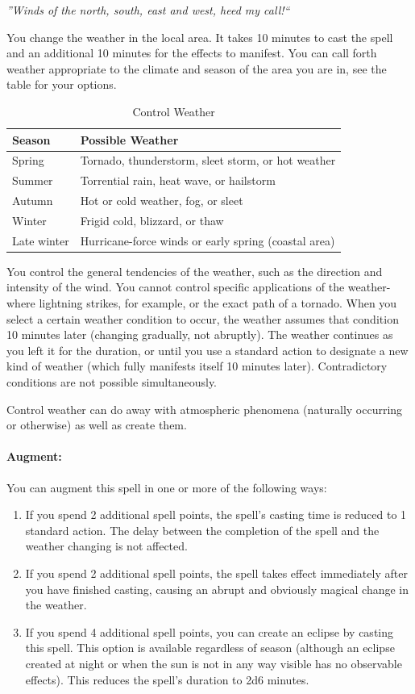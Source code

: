 \emph{''Winds of the north, south, east and west, heed my call!``}

You change the weather in the local area. 
It takes 10 minutes to cast the spell and an additional 10 minutes for the effects to manifest. 
You can call forth weather appropriate to the climate and season of the area you are in, see the  table for your options.
\begin{table}
\caption{Control Weather}
\label{tab:ControlWeather}
\begin{center}
\begin{tabular}{|l|l|}
\hline
Season &Possible Weather\\
\hline
Spring &Tornado, thunderstorm, sleet storm, or hot weather\\
Summer &Torrential rain, heat wave, or hailstorm\\
Autumn &Hot or cold weather, fog, or sleet\\
Winter &Frigid cold, blizzard, or thaw\\
Late winter &Hurricane-force winds or early spring (coastal area)\\
\hline
\end{tabular}
\end{center}
\end{table}

You control the general tendencies of the weather, such as the direction and intensity of the wind. 
You cannot control specific applications of the weather-where lightning strikes, for example, or the exact path of a tornado. 
When you select a certain weather condition to occur, the weather assumes that condition 10 minutes later (changing gradually, not abruptly). 
The weather continues as you left it for the duration, 
or until you use a standard action to designate a new kind of weather (which fully manifests itself 10 minutes later). 
Contradictory conditions are not possible simultaneously.

Control weather can do away with atmospheric phenomena (naturally occurring or otherwise) as well as create them.

\paragraph{Augment:} You can augment this spell in one or more of the following ways:
\begin{enumerate}
 \item If you spend 2 additional spell points, the spell's casting time is reduced to 1 standard action.
 The delay between the completion of the spell and the weather changing is not affected.
 \item If you spend 2 additional spell points, the spell takes effect immediately after you have finished casting,
 causing an abrupt and obviously magical change in the weather.
 \item If you spend 4 additional spell points, you can create an eclipse by casting this spell.
 This option is available regardless of season (although an eclipse created at night or when the sun is not in any way visible has no observable effects).
 This reduces the spell's duration to 2d6 minutes.
\end{enumerate}

